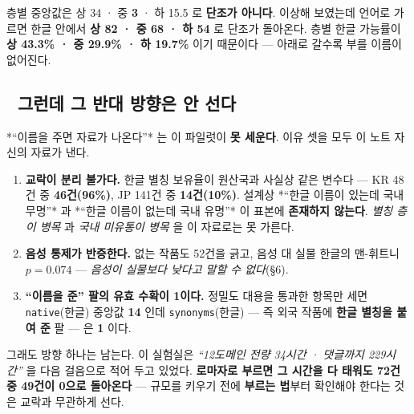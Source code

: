 \documentclass[10pt]{article}
\begin{document}
층별 중앙값은 상 34 · 중 \textbf{3} · 하 15.5 로 \textbf{단조가 아니다}. 이상해
보였는데 언어로 가르면 한글 안에서 \textbf{상 82 · 중 68 · 하 54} 로 단조가
돌아온다. 층별 한글 가능률이 \textbf{상 43.3\% · 중 29.9\% · 하 19.7\%} 이기
때문이다 --- 아래로 갈수록 부를 이름이 없어진다.


\subsection*{🔴 그런데 그 반대 방향은 안 선다}

*``이름을 주면 자료가 나온다''* 는 이 파일럿이 \textbf{못 세운다}. 이유 셋을
모두 이 노트 자신의 자료가 낸다.

\begin{enumerate}\itemsep2pt
\item \textbf{교락이 분리 불가다.} 한글 별칭 보유율이 원산국과 사실상 같은
변수다 --- KR 48건 중 \textbf{46건(96\%)}, JP 141건 중 \textbf{14건(10\%)}.
설계상 *``한글 이름이 있는데 국내 무명''* 과 *``한글 이름이 없는데 국내
유명''* 이 표본에 \textbf{존재하지 않는다}. \emph{별칭 층이 병목} 과
\emph{국내 미유통이 병목} 을 이 자료로는 못 가른다.
\item \textbf{음성 통제가 반증한다.} 없는 작품도 52건을 긁고, 음성 대 실물
한글의 맨-휘트니 \textbf{$p=0.074$} --- \emph{음성이 실물보다 낮다고 말할 수
없다}(§6).
\item \textbf{``이름을 준'' 팔의 유효 수확이 1이다.} 정밀도 대용을 통과한
항목만 세면 \texttt{native}(한글) 중앙값 \textbf{14} 인데
\texttt{synonyms}(한글) --- 즉 외국 작품에 \textbf{한글 별칭을 붙여 준} 팔 ---
은 \textbf{1} 이다.
\end{enumerate}


그래도 방향 하나는 남는다. 이 실험실은 \emph{``12도메인 전량 34시간 · 댓글까지
229시간''} 을 다음 걸음으로 적어 두고 있었다. \textbf{로마자로 부르면 그 시간을
다 태워도 72건 중 49건이 0으로 돌아온다} --- 규모를 키우기 전에 \textbf{부르는
법}부터 확인해야 한다는 것은 교락과 무관하게 선다.
\end{document}
